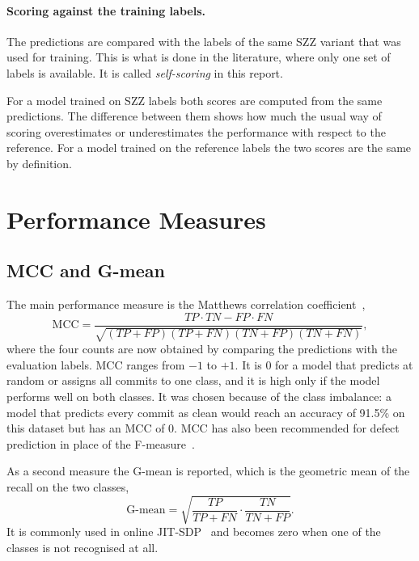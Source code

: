 \documentclass[12pt,a4paper,oneside]{report}
\begin{document}
\paragraph{Scoring against the training labels.} The predictions are
compared with the labels of the same SZZ variant that was used for training.
This is what is done in the literature, where only one set of labels is
available. It is called \emph{self-scoring} in this report.

For a model trained on SZZ labels both scores are computed from the same
predictions. The difference between them shows how much the usual way of
scoring overestimates or underestimates the performance with respect to the
reference. For a model trained on the reference labels the two scores are the
same by definition.

\section{Performance Measures}\label{sec:measures}

\subsection{MCC and G-mean}

The main performance measure is the Matthews correlation
coefficient~\cite{matthews1975mcc},
\begin{equation}
\mathrm{MCC} = \frac{TP\cdot TN - FP\cdot FN}
{\sqrt{(TP+FP)(TP+FN)(TN+FP)(TN+FN)}},
\end{equation}
where the four counts are now obtained by comparing the predictions with the
evaluation labels. MCC ranges from $-1$ to $+1$. It is 0 for a model that
predicts at random or assigns all commits to one class, and it is high only
if the model performs well on both classes. It was chosen because of the
class imbalance: a model that predicts every commit as clean would reach an
accuracy of 91.5\% on this dataset but has an MCC of 0. MCC has also been
recommended for defect prediction in place of the
F-measure~\cite{yao2020mcc,chicco2020mcc}.

As a second measure the G-mean is reported, which is the geometric mean of
the recall on the two classes,
\begin{equation}
\text{G-mean} = \sqrt{\frac{TP}{TP+FN}\cdot\frac{TN}{TN+FP}}.
\end{equation}
It is commonly used in online JIT-SDP~\cite{cabral2019orb} and becomes zero
when one of the classes is not recognised at all.
\end{document}

